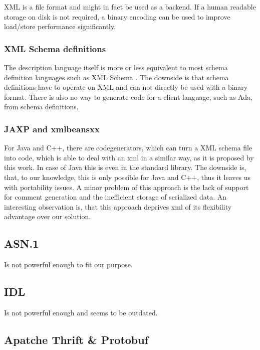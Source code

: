 \documentclass[a4paper,10pt]{article}
\begin{document}
XML is a file format and might in fact be used as a backend. If a human readable storage on disk is not required, a binary encoding can be used to improve load/store performance significantly. 


\subsubsection*{XML Schema definitions}

The description language itself is more or less equivalent to most schema definition languages such as XML Schema . The downside is that schema definitions have to operate on XML and can not directly be used with a binary format. There is also
no way to generate code for a client language, such as Ada, from schema definitions.

\subsubsection*{JAXP and xmlbeansxx}

For Java and C++, there are codegenerators, which can turn a XML schema file into code, which is able to deal with an xml in a similar way, as it is proposed by this work. In case of Java this is even in the standard library. The downside is, that, to our knowledge, this is only possible for Java and C++, thus it leaves us with portability issues. A minor problem of this approach is the lack of support for comment generation and the inefficient storage of serialized data.
An interesting observation is, that this approach deprives xml of its flexibility advantage over our solution. 


\subsection*{ASN.1}

Is not powerful enough to fit our purpose.

\subsection*{IDL}

 Is not powerful enough and seems to be outdated.


\subsection*{Apatche Thrift \& Protobuf}
\end{document}

